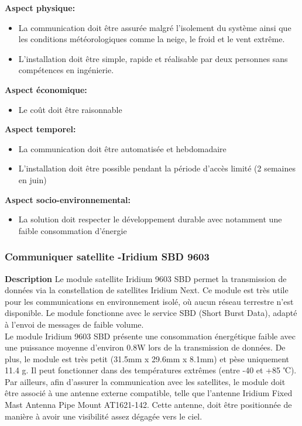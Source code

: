 \noindent\textbf{Aspect physique:}
\begin{itemize}
    \item La communication doit être assurée malgré l’isolement du système ainsi que les conditions météorologiques comme la neige, le froid et le vent extrême.
    \item L’installation doit être simple, rapide et réalisable par deux personnes sans compétences en ingénierie.
\end{itemize}

\noindent\textbf{Aspect économique:}
\begin{itemize}
    \item Le coût doit être raisonnable
\end{itemize}

\noindent\textbf{Aspect temporel:}
\begin{itemize}
    \item La communication doit être automatisée et hebdomadaire
    \item L’installation doit être possible pendant la période d’accès limité (2 semaines en juin)
\end{itemize}

\noindent\textbf{Aspect socio-environnemental:}
\begin{itemize}
    \item La solution doit respecter le développement durable avec notamment une faible consommation d’énergie
\end{itemize}


\subsubsection{Communiquer satellite -Iridium SBD 9603}
\label{sec:iridi}
\noindent\textbf{Description} Le module satellite Iridium 9603 SBD permet la transmission de données via la constellation de satellites Iridium Next. Ce module est très utile pour les communications en environnement isolé, où aucun réseau terrestre n’est disponible. Le module fonctionne avec le service SBD (Short Burst Data), adapté à l’envoi de messages de faible volume. 
\\

Le module Iridium 9603 SBD présente une consommation énergétique faible avec une puissance moyenne d’environ 0.8W lors de la transmission de données. De plus, le module est très petit (31.5mm x 29.6mm x 8.1mm) et pèse uniquement 11.4 g. Il peut fonctionner dans des températures extrêmes (entre -40 et +85 ℃). Par ailleurs, afin d’assurer la communication avec les satellites, le module doit être associé à une antenne externe compatible, telle que l’antenne Iridium Fixed Mast Antenna Pipe Mount AT1621-142. Cette antenne, doit être positionnée de manière à avoir une visibilité assez dégagée vers le ciel. \\


